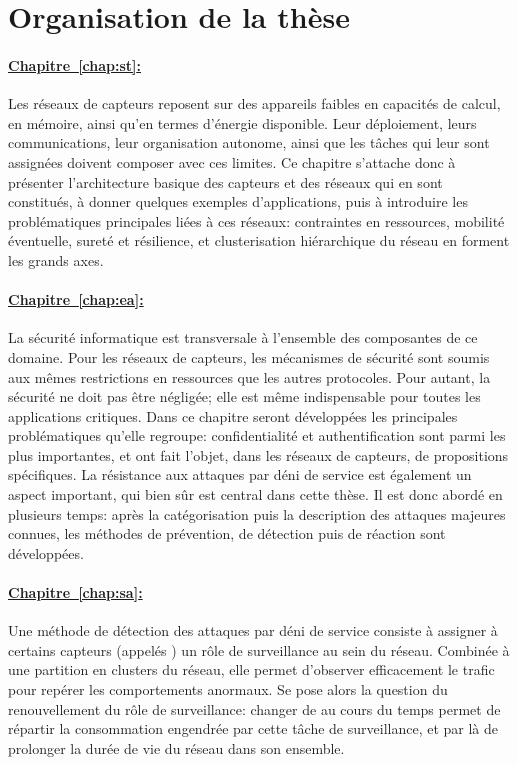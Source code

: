 \section{Organisation de la thèse}

\newcommand\chappar[1]{%
    \paragraph{\hyperref[chap:#1]{%
        Chapitre~\ref*{chap:#1}: \nameref*{chap:#1}%
}}}

\chappar{st}
Les réseaux de capteurs reposent sur des appareils faibles en capacités de calcul, en mémoire, ainsi qu'en termes d'énergie disponible.
Leur déploiement, leurs communications, leur organisation autonome, ainsi que les tâches qui leur sont assignées doivent composer avec ces limites.
Ce chapitre s'attache donc à présenter l'architecture basique des capteurs et des réseaux qui en sont constitués, à donner quelques exemples d'applications, puis à introduire les problématiques principales liées à ces réseaux: contraintes en ressources, mobilité éventuelle, sureté et résilience, et clusterisation hiérarchique du réseau en forment les grands axes.

\chappar{ea}
La sécurité informatique est transversale à l'ensemble des composantes de ce domaine.
Pour les réseaux de capteurs, les mécanismes de sécurité sont soumis aux mêmes restrictions en ressources que les autres protocoles.
Pour autant, la sécurité ne doit pas être négligée; elle est même indispensable pour toutes les applications critiques.
Dans ce chapitre seront développées les principales problématiques qu'elle regroupe: confidentialité et authentification sont parmi les plus importantes, et ont fait l'objet, dans les réseaux de capteurs, de propositions spécifiques.
La résistance aux attaques par déni de service est également un aspect important, qui bien sûr est central dans cette thèse.
Il est donc abordé en plusieurs temps: après la catégorisation puis la description des attaques majeures connues, les méthodes de prévention, de détection puis de réaction sont développées.

\chappar{sa}
Une méthode de détection des attaques par déni de service consiste à assigner à certains capteurs (appelés \cnst) un rôle de surveillance au sein du réseau.
Combinée à une partition en clusters du réseau, elle permet d'observer efficacement le trafic pour repérer les comportements anormaux.
Se pose alors la question du renouvellement du rôle de surveillance: changer de \cnst au cours du temps permet de répartir la consommation engendrée par cette tâche de surveillance, et par là de prolonger la durée de vie du réseau dans son ensemble.


